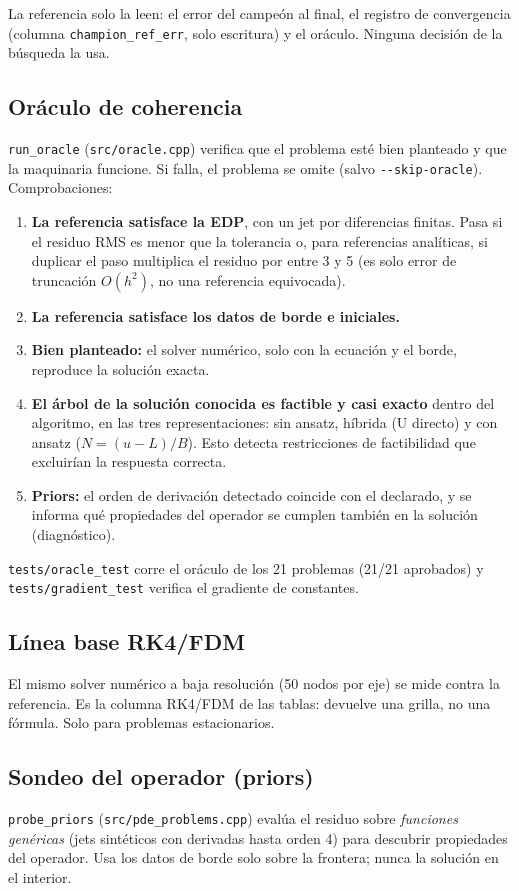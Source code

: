 \documentclass[11pt,a4paper]{article}
\newcommand{\code}[1]{\texttt{\small #1}}
\newcommand{\nota}[1]{\par\smallskip\noindent\colorbox{boxbg}{\parbox{\dimexpr\linewidth-2\fboxsep}{\small #1}}\par\smallskip}
\begin{document}
\nota{La referencia solo la leen: el error del campeón al final, el registro de convergencia (columna
\code{champion\_ref\_err}, solo escritura) y el oráculo. Ninguna decisión de la búsqueda la usa.}

\subsection{Oráculo de coherencia}
\code{run\_oracle} (\code{src/oracle.cpp}) verifica que el problema esté bien planteado y que la
maquinaria funcione. Si falla, el problema se omite (salvo \code{-{}-skip-oracle}). Comprobaciones:
\begin{enumerate}
\item \textbf{La referencia satisface la EDP}, con un jet por diferencias finitas. Pasa si el residuo
  RMS es menor que la tolerancia o, para referencias analíticas, si duplicar el paso multiplica el
  residuo por entre 3 y 5 (es solo error de truncación $O(h^2)$, no una referencia equivocada).
\item \textbf{La referencia satisface los datos de borde e iniciales.}
\item \textbf{Bien planteado:} el solver numérico, solo con la ecuación y el borde, reproduce la solución
  exacta.
\item \textbf{El árbol de la solución conocida es factible y casi exacto} dentro del algoritmo, en las
  tres representaciones: sin ansatz, híbrida (U directo) y con ansatz ($N=(u-L)/B$). Esto detecta
  restricciones de factibilidad que excluirían la respuesta correcta.
\item \textbf{Priors:} el orden de derivación detectado coincide con el declarado, y se informa qué
  propiedades del operador se cumplen también en la solución (diagnóstico).
\end{enumerate}
\code{tests/oracle\_test} corre el oráculo de los 21 problemas (21/21 aprobados) y
\code{tests/gradient\_test} verifica el gradiente de constantes.

\subsection{Línea base RK4/FDM}
El mismo solver numérico a baja resolución (50 nodos por eje) se mide contra la referencia. Es la
columna RK4/FDM de las tablas: devuelve una grilla, no una fórmula. Solo para problemas estacionarios.

\subsection{Sondeo del operador (priors)}
\code{probe\_priors} (\code{src/pde\_problems.cpp}) evalúa el residuo sobre \emph{funciones genéricas}
(jets sintéticos con derivadas hasta orden 4) para descubrir propiedades del operador. Usa los datos de
borde solo sobre la frontera; nunca la solución en el interior.
\end{document}
